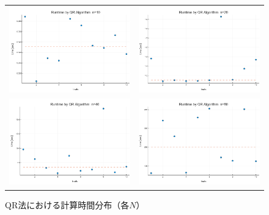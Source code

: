 \documentclass[a4paper,11pt]{ltjsarticle}
\begin{document}
\begin{figure}[H]
  \centering
  \begin{tabular}{cc}
    \includegraphics[width=72mm]{graphs/exp5_n10_time.png} &
    \includegraphics[width=72mm]{graphs/exp5_n20_time.png} \\
    \includegraphics[width=72mm]{graphs/exp5_n40_time.png} &
    \includegraphics[width=72mm]{graphs/exp5_n80_time.png} \\
  \end{tabular}
  \caption{QR法における計算時間分布（各$N$）}
  \label{fig:exp5_times}
\end{figure}
\end{document}

